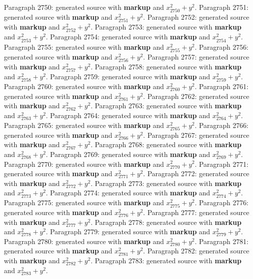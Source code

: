 \documentclass{article}
\begin{document}
Paragraph 2750: generated source with \textbf{markup} and $x_{2750}^2 + y^2$.
Paragraph 2751: generated source with \textbf{markup} and $x_{2751}^2 + y^2$.
Paragraph 2752: generated source with \textbf{markup} and $x_{2752}^2 + y^2$.
Paragraph 2753: generated source with \textbf{markup} and $x_{2753}^2 + y^2$.
Paragraph 2754: generated source with \textbf{markup} and $x_{2754}^2 + y^2$.
Paragraph 2755: generated source with \textbf{markup} and $x_{2755}^2 + y^2$.
Paragraph 2756: generated source with \textbf{markup} and $x_{2756}^2 + y^2$.
Paragraph 2757: generated source with \textbf{markup} and $x_{2757}^2 + y^2$.
Paragraph 2758: generated source with \textbf{markup} and $x_{2758}^2 + y^2$.
Paragraph 2759: generated source with \textbf{markup} and $x_{2759}^2 + y^2$.
Paragraph 2760: generated source with \textbf{markup} and $x_{2760}^2 + y^2$.
Paragraph 2761: generated source with \textbf{markup} and $x_{2761}^2 + y^2$.
Paragraph 2762: generated source with \textbf{markup} and $x_{2762}^2 + y^2$.
Paragraph 2763: generated source with \textbf{markup} and $x_{2763}^2 + y^2$.
Paragraph 2764: generated source with \textbf{markup} and $x_{2764}^2 + y^2$.
Paragraph 2765: generated source with \textbf{markup} and $x_{2765}^2 + y^2$.
Paragraph 2766: generated source with \textbf{markup} and $x_{2766}^2 + y^2$.
Paragraph 2767: generated source with \textbf{markup} and $x_{2767}^2 + y^2$.
Paragraph 2768: generated source with \textbf{markup} and $x_{2768}^2 + y^2$.
Paragraph 2769: generated source with \textbf{markup} and $x_{2769}^2 + y^2$.
Paragraph 2770: generated source with \textbf{markup} and $x_{2770}^2 + y^2$.
Paragraph 2771: generated source with \textbf{markup} and $x_{2771}^2 + y^2$.
Paragraph 2772: generated source with \textbf{markup} and $x_{2772}^2 + y^2$.
Paragraph 2773: generated source with \textbf{markup} and $x_{2773}^2 + y^2$.
Paragraph 2774: generated source with \textbf{markup} and $x_{2774}^2 + y^2$.
Paragraph 2775: generated source with \textbf{markup} and $x_{2775}^2 + y^2$.
Paragraph 2776: generated source with \textbf{markup} and $x_{2776}^2 + y^2$.
Paragraph 2777: generated source with \textbf{markup} and $x_{2777}^2 + y^2$.
Paragraph 2778: generated source with \textbf{markup} and $x_{2778}^2 + y^2$.
Paragraph 2779: generated source with \textbf{markup} and $x_{2779}^2 + y^2$.
Paragraph 2780: generated source with \textbf{markup} and $x_{2780}^2 + y^2$.
Paragraph 2781: generated source with \textbf{markup} and $x_{2781}^2 + y^2$.
Paragraph 2782: generated source with \textbf{markup} and $x_{2782}^2 + y^2$.
Paragraph 2783: generated source with \textbf{markup} and $x_{2783}^2 + y^2$.
\end{document}
